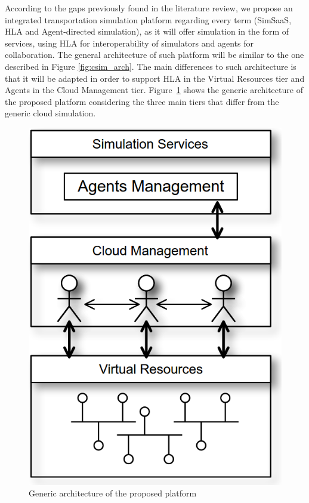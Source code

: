 \documentclass[conference]{IEEEtran}
\begin{document}
According to the gaps previously found in the literature review, we propose an integrated transportation simulation platform regarding every term (SimSaaS, HLA and Agent-directed simulation), as it will offer simulation in the form of services, using HLA for interoperability of simulators and agents for collaboration. The general architecture of such platform will be similar to the one described in Figure \ref{fig:csim_arch}. The main differences to such architecture is that it will be adapted in order to support HLA in the Virtual Resources tier and Agents in the Cloud Management tier. Figure~\ref{fig:general_arch} shows the generic architecture of the proposed platform considering the three main tiers that differ from the generic cloud simulation.

\begin{figure}[h!]
\centering
\includegraphics[height=.25\textheight]{general_arch.png}
\caption{Generic architecture of the proposed platform}
\label{fig:general_arch}
\vspace{-0.9em}
\end{figure}
 
\end{document}
